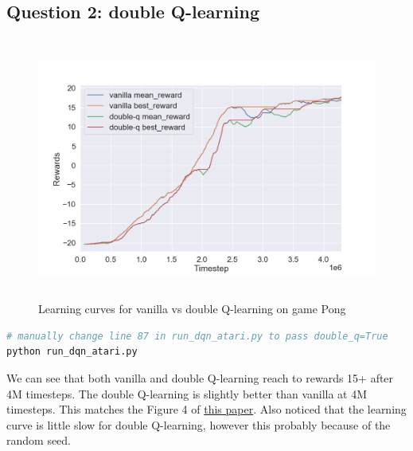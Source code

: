 \documentclass[12pt]{article}
\begin{document}
\subsection*{Question 2: double Q-learning}
\begin{figure}[H]
  \centering
  \includegraphics[height=3.4in]{part1_q2.png}
  \caption{Learning curves for vanilla vs double Q-learning on game Pong}
\end{figure}
\begin{lstlisting}[language=bash]
# manually change line 87 in run_dqn_atari.py to pass double_q=True
python run_dqn_atari.py
\end{lstlisting}
We can see that both vanilla and double Q-learning reach to rewards 15+ after 4M timesteps. The double Q-learning is slightly better than vanilla at 4M timesteps. This matches the Figure 4 of \href{https://arxiv.org/pdf/1509.06461.pdf}{this paper}. Also noticed that the learning curve is little slow for double Q-learning, however this probably because of the random seed.
\end{document}
